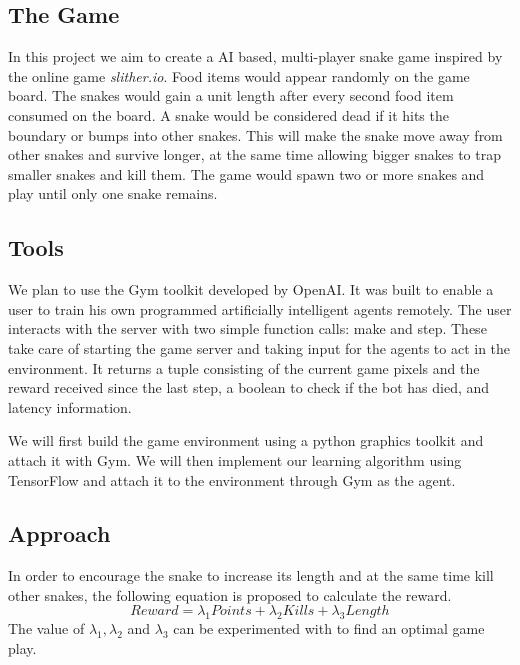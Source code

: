 \documentclass[conference]{IEEEtran}
\begin{document}
\subsection{The Game}

In this project we aim to create a AI based, multi-player snake game inspired
by the online game \textit{slither.io}. Food items would appear randomly on
the game board. The snakes would gain a unit length after every second food
item consumed on the board. A snake would be considered dead if it hits the
boundary or bumps into other snakes. This will make the snake move away from
other snakes and survive longer, at the same time allowing bigger snakes to
trap smaller snakes and kill them. The game would spawn two or more snakes
and play until only one snake remains.\newline\par

\subsection{Tools}
We plan to use the Gym toolkit developed by OpenAI\cite{sd1}. It was built to
enable a user to train his own programmed artificially intelligent agents
remotely. The user interacts with the server with two simple function calls:
make and step. These take care of starting the game server and taking input
for the agents to act in the environment. It returns a tuple consisting of the
current game pixels and the reward received since the last step, a boolean to
check if the bot has died, and latency information.
\newline\par
We will first build the game environment using a python graphics toolkit
and attach it with Gym. We will then implement our learning algorithm
using TensorFlow\cite{n2} and attach it to the environment through Gym as
the agent. \newline\par

\subsection{Approach}
In order to encourage the snake to increase its length and at the same time kill other snakes, the following equation is proposed to calculate the reward.
\begin{equation}
Reward = \lambda_1 Points+ \lambda_2 Kills+\lambda_3Length
\end{equation}
The value of \({\lambda_1,\lambda_2}\) and \({\lambda_3}\) can be experimented with to find an optimal game play.
\end{document}
